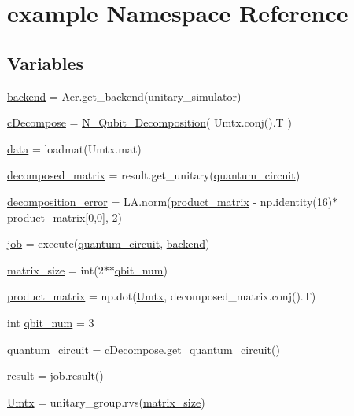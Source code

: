 \hypertarget{namespaceexample}{}\section{example Namespace Reference}
\label{namespaceexample}
\subsection*{Variables}
\begin{DoxyCompactItemize}
\item 
\hyperlink{namespaceexample_a6b87ddad36fca2722dc5fd955536f578}{backend} = Aer.\+get\+\_\+backend(\textquotesingle{}unitary\+\_\+simulator\textquotesingle{})
\item 
\hyperlink{namespaceexample_a0a2e936f47382b2bd8c9432ca77c6026}{c\+Decompose} = \hyperlink{classqgd__python_1_1_n___qubit___decomposition_1_1_n___qubit___decomposition}{N\+\_\+\+Qubit\+\_\+\+Decomposition}( Umtx.\+conj().T )
\item 
\hyperlink{namespaceexample_a9b062b4feb0fe50b0056ed5abb65681c}{data} = loadmat(\textquotesingle{}Umtx.\+mat\textquotesingle{})
\item 
\hyperlink{namespaceexample_a4373e9d1485c7c940b9360eb187bca34}{decomposed\+\_\+matrix} = result.\+get\+\_\+unitary(\hyperlink{namespaceexample_a1602c6a1a270f94e2c254b3b6501cd86}{quantum\+\_\+circuit})
\item 
\hyperlink{namespaceexample_af790bb908348ee47307d4eb3668aa5a0}{decomposition\+\_\+error} = L\+A.\+norm(\hyperlink{namespaceexample_ac1039984599e8ffdf0b609b0e2790c1a}{product\+\_\+matrix} -\/ np.\+identity(16)$\ast$\hyperlink{namespaceexample_ac1039984599e8ffdf0b609b0e2790c1a}{product\+\_\+matrix}\mbox{[}0,0\mbox{]}, 2)
\item 
\hyperlink{namespaceexample_acc723d25fd7224c46ee94d2866c9f96a}{job} = execute(\hyperlink{namespaceexample_a1602c6a1a270f94e2c254b3b6501cd86}{quantum\+\_\+circuit}, \hyperlink{namespaceexample_a6b87ddad36fca2722dc5fd955536f578}{backend})
\item 
\hyperlink{namespaceexample_ae04701779f635cdceb8bdee5c8ff074f}{matrix\+\_\+size} = int(2$\ast$$\ast$\hyperlink{namespaceexample_aedf2ea7d5e512f6db84a19d73dbd5305}{qbit\+\_\+num})
\item 
\hyperlink{namespaceexample_ac1039984599e8ffdf0b609b0e2790c1a}{product\+\_\+matrix} = np.\+dot(\hyperlink{namespaceexample_a9f6bbbedb3a0154f9a0199a632198b9f}{Umtx}, decomposed\+\_\+matrix.\+conj().T)
\item 
int \hyperlink{namespaceexample_aedf2ea7d5e512f6db84a19d73dbd5305}{qbit\+\_\+num} = 3
\item 
\hyperlink{namespaceexample_a1602c6a1a270f94e2c254b3b6501cd86}{quantum\+\_\+circuit} = c\+Decompose.\+get\+\_\+quantum\+\_\+circuit()
\item 
\hyperlink{namespaceexample_ae9f7cf9f0786fe88c5590ca4ad5a295a}{result} = job.\+result()
\item 
\hyperlink{namespaceexample_a9f6bbbedb3a0154f9a0199a632198b9f}{Umtx} = unitary\+\_\+group.\+rvs(\hyperlink{namespaceexample_ae04701779f635cdceb8bdee5c8ff074f}{matrix\+\_\+size})
\end{DoxyCompactItemize}


